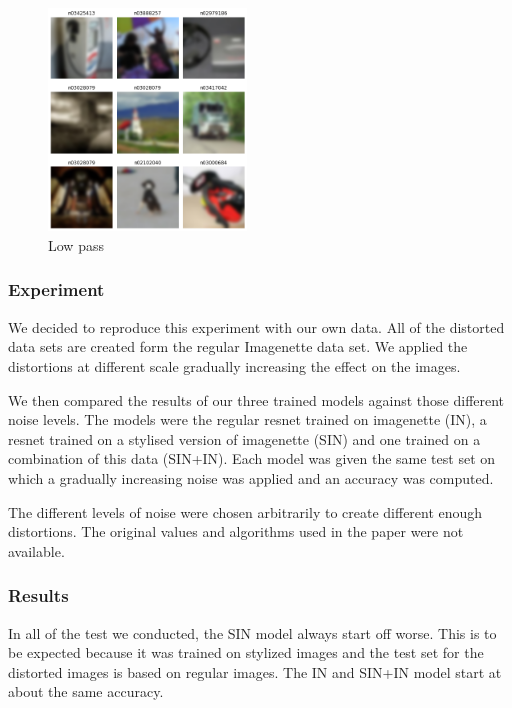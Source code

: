 \documentclass{article}
\begin{document}
\begin{figure}[h!]
\centering
\includegraphics[width = 0.47\textwidth]{imgs/image_low}
\caption{Low pass}
\end{figure}

\subsubsection{Experiment}

We decided to reproduce this experiment with our own data.
All of the distorted data sets are created form the regular Imagenette data set. 
We applied the distortions at different scale gradually increasing the effect on the images. \medskip \par

\noindent
We then compared the results of our three trained models against those different noise levels.
The models were the regular resnet trained on imagenette (IN), a resnet trained on a stylised version of imagenette (SIN) and one trained on a combination of this data (SIN+IN).
Each model was given the same test set on which a gradually increasing noise was applied and an accuracy 
was computed. \medskip \par

\noindent
The different levels of noise were chosen arbitrarily to create different enough distortions. The original values and algorithms used in the paper were not available.

\subsubsection{Results}

In all of the test we conducted, the SIN model always start off worse. This is to be expected because it was trained on stylized images 
and the test set for the distorted images is based on regular images. 
The IN and SIN+IN model start at about the same accuracy. \medskip \par
\end{document}
